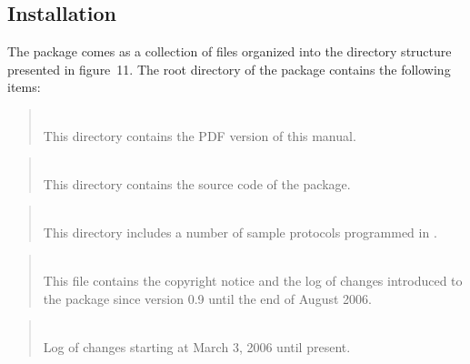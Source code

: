 
\subsection{Installation}
\label{rm_un_in}

The package comes as a collection of files organized into the directory
structure presented in
figure~11.
The root directory of the package contains the following items:

\medskip

\begin{quote}
\noindent{}\\ \hspace{0in}
This directory contains the PDF version of this manual.
\end{quote}

\begin{quote}
\noindent{}\\ \hspace{0in}
This directory contains the source code of the package.
\end{quote}

\begin{quote}
\noindent{}\\ \hspace{0in}
This directory includes a number of sample protocols programmed in
\smurph.
\end{quote}

\begin{quote}
\noindent{}\\ \hspace{0in}
This file contains the copyright notice and the log of changes
introduced to the package since version 0.9 until the end of August 2006.
\end{quote}

\begin{quote}
\noindent{}\\ \hspace{0in}
Log of changes starting at March 3, 2006 until present.
\end{quote}

